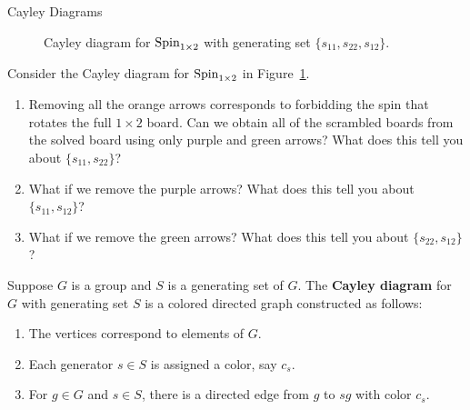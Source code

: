 \begin{section}{Cayley Diagrams}
\begin{figure}[!ht]
\centering
{}
\caption{Cayley diagram for $\operatorname{Spin}_{1\times 2}$ with generating set $\{s_{11},s_{22},s_{12}\}$.}
\label{fig:Cayley_Spin_1x2_group_labels}
\end{figure}

\begin{problem}\label{cayley:altSpin1x2}
Consider the Cayley diagram for $\operatorname{Spin}_{1\times 2}$ in Figure~\ref{fig:Cayley_Spin_1x2_group_labels}.
\begin{enumerate}[label=\textrm{(\alph*)}]
\item Removing all the {\color{cb-orange}orange}  arrows corresponds to forbidding the spin that rotates the full $1\times 2$ board. Can we obtain all of the scrambled boards from the solved board using only {\color{cb-purple}purple} and {\color{cb-green}green} arrows? What does this tell you about $\{s_{11},s_{22}\}$?
\item What if we remove the {\color{cb-purple}purple} arrows? What does this tell you about $\{s_{11},s_{12}\}$?
\item What if we remove the {\color{cb-green}green} arrows? What does this tell you about $\{s_{22},s_{12}\}$?
\end{enumerate}
\end{problem}

\begin{definition}
Suppose $G$ is a group and $S$ is a generating set of $G$. The \textbf{Cayley diagram} for $G$ with generating set $S$ is a colored directed graph constructed as follows:
\begin{enumerate}[label=\textrm{(\alph*)}]
\item The vertices correspond to elements of $G$.
\item Each generator $s\in S$ is assigned a color, say $c_s$.
\item For $g\in G$ and $s\in S$, there is a directed edge from $g$ to $sg$ with color $c_s$.
\end{enumerate}
\end{definition}


\end{section}
